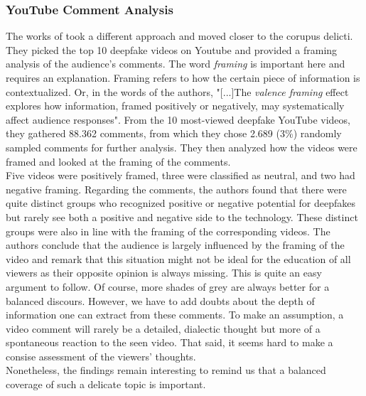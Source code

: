 \documentclass[
  a4paper,  %
  twoside,  %
  bibliography=totoc,
  headsepline,
  cleardoublepage=empty,
  parskip=half,
  draft=false
]{scrbook}
\begin{document}
\subsubsection*{YouTube Comment Analysis}
The works of \citeauthor{leeBelieveNotBelieve2021} took a different approach and moved closer to the corupus delicti. They picked the top 10 deepfake videos on Youtube and provided a framing analysis of the audience's comments. The word \textit{framing} is important here and requires an explanation. Framing refers to how the certain piece of information is contextualized. Or, in the words of the authors, "[...]The \textit{valence framing} effect explores how information, framed positively or negatively, may systematically affect audience responses". From the 10 most-viewed deepfake YouTube videos, they gathered 88.362 comments, from which they chose 2.689 (3\%) randomly sampled comments for further analysis. They then analyzed how the videos were framed and looked at the framing of the comments.\\
Five videos were positively framed, three were classified as neutral, and two had negative framing. Regarding the comments, the authors found that there were quite distinct groups who recognized positive or negative potential for deepfakes but rarely see both a positive and negative side to the technology. These distinct groups were also in line with the framing of the corresponding videos. The authors conclude that the audience is largely influenced by the framing of the video and remark that this situation might not be ideal for the education of all viewers as their opposite opinion is always missing. This is quite an easy argument to follow. Of course, more shades of grey are always better for a balanced discours. However, we have to add doubts about the depth of information one can extract from these comments. To make an assumption, a video comment will rarely be a detailed, dialectic thought but more of a spontaneous reaction to the seen video. That said, it seems hard to make a consise assessment of the viewers' thoughts. \\
Nonetheless, the findings remain interesting to remind us that a balanced coverage of such a delicate topic is important.
\end{document}
